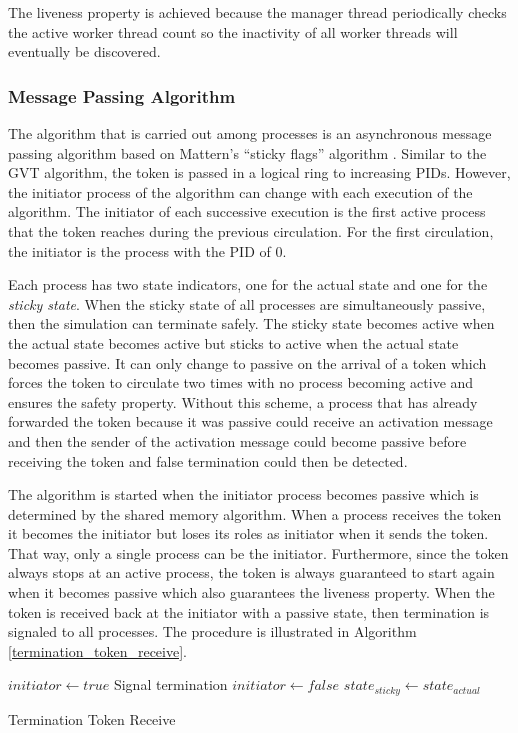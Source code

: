 \documentclass[11pt]{book}
\begin{document}
The liveness property is achieved because the manager thread periodically checks the active
worker thread count so the inactivity of all worker threads will eventually be discovered.

\subsubsection{Message Passing Algorithm}

The algorithm that is carried out among processes is an asynchronous message passing algorithm based
on Mattern's ``sticky flags'' algorithm \cite{mattern-91}.  Similar to the GVT algorithm, the token
is passed in a logical ring to increasing PIDs.  However, the initiator process of the algorithm can
change with each execution of the algorithm.  The initiator of each successive execution is the
first active process that the token reaches during the previous circulation.  For the first
circulation, the initiator is the process with the PID of 0.

Each process has two state indicators, one for the actual state and one for the \emph{sticky state}.
When the sticky state of all processes are simultaneously passive, then the simulation can terminate
safely.  The sticky state becomes active when the actual state becomes active but sticks to active
when the actual state becomes passive.  It can only change to passive on the arrival of a token
which forces the token to circulate two times with no process becoming active and ensures the safety
property.  Without this scheme, a process that has already forwarded the token because it was
passive could receive an activation message and then the sender of the activation message could
become passive before receiving the token and false termination could then be detected.

The algorithm is started when the initiator process becomes passive which is determined by the
shared memory algorithm.  When a process receives the token it becomes the initiator but loses its
roles as initiator when it sends the token.  That way, only a single process can be the initiator.
Furthermore, since the token always stops at an active process, the token is always guaranteed to
start again when it becomes passive which also guarantees the liveness property.  When the token is
received back at the initiator with a passive state, then termination is signaled to all processes.
The procedure is illustrated in Algorithm \ref{termination_token_receive}.

\begin{algorithm}
\DontPrintSemicolon
{}
    $initiator \gets true$\;
     {
         {
            Signal termination\;
        }
    }  {
        $initiator \gets false$\;
        \;
    }
    $state_{sticky} \gets state_{actual}$\;
\caption{Termination Token Receive}\label{termination_token_receive}
\end{algorithm}
\end{document}
